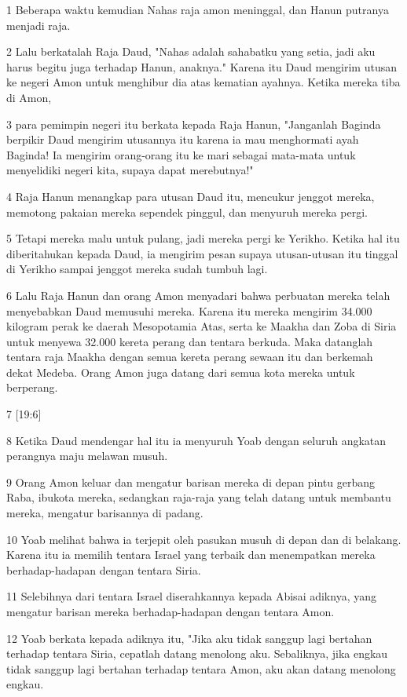 \par 1 Beberapa waktu kemudian Nahas raja amon meninggal, dan Hanun putranya menjadi raja.
\par 2 Lalu berkatalah Raja Daud, "Nahas adalah sahabatku yang setia, jadi aku harus begitu juga terhadap Hanun, anaknya." Karena itu Daud mengirim utusan ke negeri Amon untuk menghibur dia atas kematian ayahnya. Ketika mereka tiba di Amon,
\par 3 para pemimpin negeri itu berkata kepada Raja Hanun, "Janganlah Baginda berpikir Daud mengirim utusannya itu karena ia mau menghormati ayah Baginda! Ia mengirim orang-orang itu ke mari sebagai mata-mata untuk menyelidiki negeri kita, supaya dapat merebutnya!"
\par 4 Raja Hanun menangkap para utusan Daud itu, mencukur jenggot mereka, memotong pakaian mereka sependek pinggul, dan menyuruh mereka pergi.
\par 5 Tetapi mereka malu untuk pulang, jadi mereka pergi ke Yerikho. Ketika hal itu diberitahukan kepada Daud, ia mengirim pesan supaya utusan-utusan itu tinggal di Yerikho sampai jenggot mereka sudah tumbuh lagi.
\par 6 Lalu Raja Hanun dan orang Amon menyadari bahwa perbuatan mereka telah menyebabkan Daud memusuhi mereka. Karena itu mereka mengirim 34.000 kilogram perak ke daerah Mesopotamia Atas, serta ke Maakha dan Zoba di Siria untuk menyewa 32.000 kereta perang dan tentara berkuda. Maka datanglah tentara raja Maakha dengan semua kereta perang sewaan itu dan berkemah dekat Medeba. Orang Amon juga datang dari semua kota mereka untuk berperang.
\par 7 [19:6]
\par 8 Ketika Daud mendengar hal itu ia menyuruh Yoab dengan seluruh angkatan perangnya maju melawan musuh.
\par 9 Orang Amon keluar dan mengatur barisan mereka di depan pintu gerbang Raba, ibukota mereka, sedangkan raja-raja yang telah datang untuk membantu mereka, mengatur barisannya di padang.
\par 10 Yoab melihat bahwa ia terjepit oleh pasukan musuh di depan dan di belakang. Karena itu ia memilih tentara Israel yang terbaik dan menempatkan mereka berhadap-hadapan dengan tentara Siria.
\par 11 Selebihnya dari tentara Israel diserahkannya kepada Abisai adiknya, yang mengatur barisan mereka berhadap-hadapan dengan tentara Amon.
\par 12 Yoab berkata kepada adiknya itu, "Jika aku tidak sanggup lagi bertahan terhadap tentara Siria, cepatlah datang menolong aku. Sebaliknya, jika engkau tidak sanggup lagi bertahan terhadap tentara Amon, aku akan datang menolong engkau.
